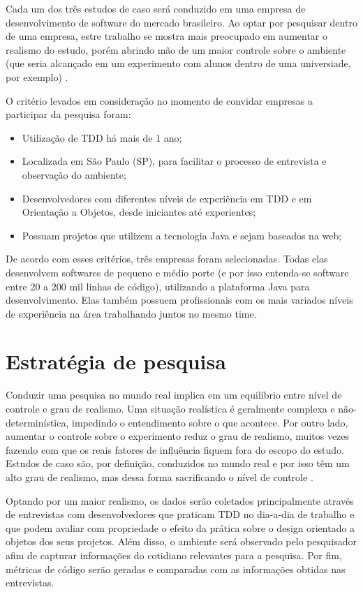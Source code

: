 Cada um dos três estudos de caso será conduzido em uma empresa de desenvolvimento de software do mercado brasileiro. Ao optar
por pesquisar dentro de uma empresa, estre trabalho se mostra mais preocupado em aumentar o realismo do estudo, porém abrindo mão 
de um maior controle sobre o ambiente (que seria alcançado em um experimento com alunos dentro de uma universiade, por exemplo) \cite{tripe-experimento}.

O critério levados em consideração no momento de convidar empresas a participar da pesquisa foram:

\begin{itemize}
	\item Utilização de TDD há mais de 1 ano;
	\item Localizada em São Paulo (SP), para facilitar o processo de entrevista e observação do ambiente;
	\item Desenvolvedores com diferentes níveis de experiência em TDD e em Orientação a Objetos, desde iniciantes até experientes; 
	\item Possuam projetos que utilizem a tecnologia Java e sejam baseados na web;
\end{itemize}

De acordo com esses critérios, três empresas foram selecionadas. 
Todas elas desenvolvem softwares de pequeno e médio porte (e por isso entenda-se software entre 20 a 200 mil linhas de código), 
utilizando a plataforma Java para desenvolvimento. Elas também possuem profissionais com os mais variados níveis de experiência
na área trabalhando juntos no mesmo time.

\section{Estratégia de pesquisa} 
\label{sec:planejamento-estrategia}

Conduzir uma pesquisa no mundo real implica em um equilíbrio entre nível de controle e grau de realismo. 
Uma situação realística é geralmente complexa e não-determinística, impedindo o entendimento sobre o que
acontece. Por outro lado, aumentar o controle sobre o experimento reduz o grau de realismo, muitos
vezes fazendo com que os reais fatores de influência fiquem fora do escopo do estudo. Estudos de caso são,
por definição, conduzidos no mundo real e por isso têm um alto grau de realismo, mas dessa forma sacrificando
o nível de controle \cite{guidelines-case-study}.

Optando por um maior realismo, os dados serão coletados principalmente através de entrevistas com desenvolvedores
que praticam TDD no dia-a-dia de trabalho e que podem avaliar com propriedade o efeito da prática sobre o
design orientado a objetos dos seus projetos. Além disso, o ambiente será observado pelo pesquisador afim de 
capturar informações do cotidiano relevantes para a pesquisa. Por fim, métricas de código serão geradas e
comparadas com as informações obtidas nas entrevistas.

